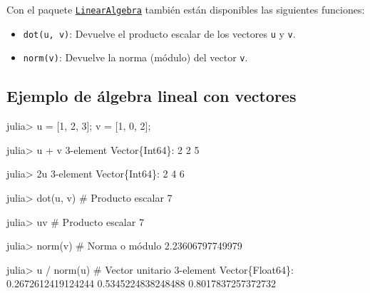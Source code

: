 \documentclass[
  letterpaper,
  DIV=11,
  numbers=noendperiod]{scrreprt}
\newenvironment{Shaded}{\begin{snugshade}}{\end{snugshade}}
\newcommand{\CommentTok}[1]{\textcolor[rgb]{0.37,0.37,0.37}{#1}}
\newcommand{\DataTypeTok}[1]{\textcolor[rgb]{0.68,0.00,0.00}{#1}}
\newcommand{\FloatTok}[1]{\textcolor[rgb]{0.68,0.00,0.00}{#1}}
\newcommand{\FunctionTok}[1]{\textcolor[rgb]{0.28,0.35,0.67}{#1}}
\newcommand{\NormalTok}[1]{\textcolor[rgb]{0.00,0.23,0.31}{#1}}
\newcommand{\OperatorTok}[1]{\textcolor[rgb]{0.37,0.37,0.37}{#1}}
\providecommand{\tightlist}{%
  \setlength{\itemsep}{0pt}\setlength{\parskip}{0pt}}\usepackage{longtable,booktabs,array}
\begin{document}
Con el paquete
\href{https://docs.julialang.org/en/v1/stdlib/LinearAlgebra/}{\texttt{LinearAlgebra}}
también están disponibles las siguientes funciones:

\begin{itemize}
\tightlist
\item
  \texttt{dot(u,\ v)}: Devuelve el producto escalar de los vectores
  \texttt{u} y \texttt{v}.
\item
  \texttt{norm(v)}: Devuelve la norma (módulo) del vector \texttt{v}.
\end{itemize}

\hypertarget{ejemplo-de-uxe1lgebra-lineal-con-vectores}{%
\subsection{Ejemplo de álgebra lineal con
vectores}\label{ejemplo-de-uxe1lgebra-lineal-con-vectores}}

\begin{Shaded}
\begin{Highlighting}[]
\NormalTok{julia}\OperatorTok{\textgreater{}}\NormalTok{ u }\OperatorTok{=}\NormalTok{ [}\FloatTok{1}\NormalTok{, }\FloatTok{2}\NormalTok{, }\FloatTok{3}\NormalTok{]; v }\OperatorTok{=}\NormalTok{ [}\FloatTok{1}\NormalTok{, }\FloatTok{0}\NormalTok{, }\FloatTok{2}\NormalTok{];}

\NormalTok{julia}\OperatorTok{\textgreater{}}\NormalTok{ u }\OperatorTok{+}\NormalTok{ v}
\FloatTok{3}\OperatorTok{{-}}\NormalTok{element }\DataTypeTok{Vector}\NormalTok{\{}\DataTypeTok{Int64}\NormalTok{\}}\OperatorTok{:}
 \FloatTok{2}
 \FloatTok{2}
 \FloatTok{5}

\NormalTok{julia}\OperatorTok{\textgreater{}} \FloatTok{2}\NormalTok{u}
\FloatTok{3}\OperatorTok{{-}}\NormalTok{element }\DataTypeTok{Vector}\NormalTok{\{}\DataTypeTok{Int64}\NormalTok{\}}\OperatorTok{:}
 \FloatTok{2}
 \FloatTok{4}
 \FloatTok{6}

\NormalTok{julia}\OperatorTok{\textgreater{}} \FunctionTok{dot}\NormalTok{(u, v)  }\CommentTok{\# Producto escalar}
\FloatTok{7}

\NormalTok{julia}\OperatorTok{\textgreater{}}\NormalTok{ u}\OperatorTok{\textquotesingle{}}\NormalTok{v  }\CommentTok{\# Producto escalar}
\FloatTok{7}

\NormalTok{julia}\OperatorTok{\textgreater{}} \FunctionTok{norm}\NormalTok{(v)  }\CommentTok{\# Norma o módulo}
\FloatTok{2.23606797749979}

\NormalTok{julia}\OperatorTok{\textgreater{}}\NormalTok{ u }\OperatorTok{/} \FunctionTok{norm}\NormalTok{(u)  }\CommentTok{\# Vector unitario}
\FloatTok{3}\OperatorTok{{-}}\NormalTok{element }\DataTypeTok{Vector}\NormalTok{\{}\DataTypeTok{Float64}\NormalTok{\}}\OperatorTok{:}
 \FloatTok{0.2672612419124244}
 \FloatTok{0.5345224838248488}
 \FloatTok{0.8017837257372732}
\end{Highlighting}
\end{Shaded}
\end{document}
